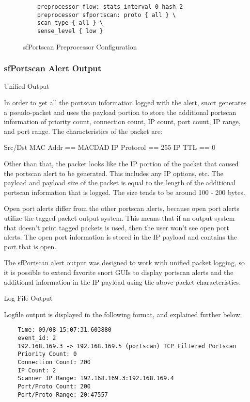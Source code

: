 \documentclass[english]{report}
\begin{document}
\begin{figure}[!hbpt]
\begin{verbatim}
	preprocessor flow: stats_interval 0 hash 2
	preprocessor sfportscan: proto { all } \
    scan_type { all } \
    sense_level { low }
\end{verbatim}
\caption{sfPortscan Preprocessor Configuration \label{sfPortscan Example}}
\end{figure}


\subsubsection{sfPortscan Alert Output\label{sfportscan alert output}}

Unified Output

In order to get all the portscan information logged with the alert, snort
generates a pseudo-packet and uses the payload portion to store the additional
portscan information of priority count, connection count, IP count, port count,
IP range, and port range.  The characteristics of the packet are:

Src/Dst MAC Addr == MACDAD
IP Protocol == 255
IP TTL == 0

Other than that, the packet looks like the IP portion of the packet that caused
the portscan alert to be generated.  This includes any IP options, etc.  The
payload and payload size of the packet is equal to the length of the additional
portscan information that is logged.  The size tends to be around 100 - 200
bytes.

Open port alerts differ from the other portscan alerts, because open port alerts
utilize the tagged packet output system.  This means that if an output system
that doesn't print tagged packets is used, then the user won't see open port
alerts.  The open port information is stored in the IP payload and
contains the port that is open.

The sfPortscan alert output was designed to work with unified packet logging, so
it is possible to extend favorite snort GUIs to display portscan alerts and the
additional information in the IP payload using the above packet characteristics.

Log File Output

Logfile output is displayed in the following format, and explained further
below:

\begin{verbatim}
	Time: 09/08-15:07:31.603880
	event_id: 2
	192.168.169.3 -> 192.168.169.5 (portscan) TCP Filtered Portscan
	Priority Count: 0
	Connection Count: 200
	IP Count: 2
	Scanner IP Range: 192.168.169.3:192.168.169.4
	Port/Proto Count: 200
	Port/Proto Range: 20:47557
\end{verbatim}
\end{document}
